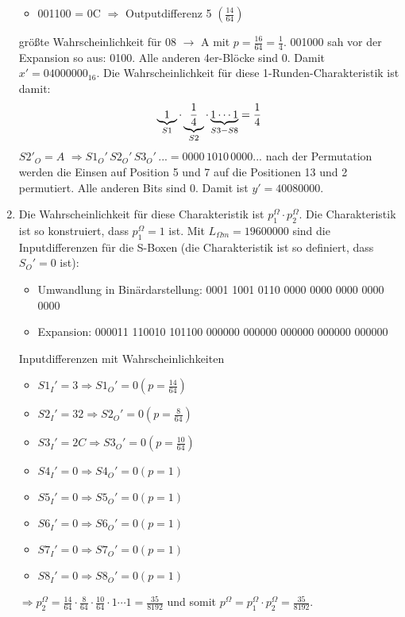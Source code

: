 \documentclass{article}
\begin{document}
\begin{enumerate}[label=(\alph*)]
\begin{itemize}
			\item 001100 = 0C $\Rightarrow$ Outputdifferenz 5 $\left(\frac{14}{64}\right)$
		\end{itemize}
		größte Wahrscheinlichkeit für 08 $\to$ A mit $p=\frac{16}{64} = \frac{1}{4}$. 001000 sah vor der Expansion so aus: 0100. Alle anderen 4er-Blöcke sind 0. Damit $x' = 04000000_{16}$. Die Wahrscheinlichkeit für diese 1-Runden-Charakteristik ist damit:
		\begin{align}
			\underbrace{1}_{S1}\cdot \underbrace{\frac{1}{4}}_{S2} \cdot \underbrace{1 \cdots 1}_{S3-S8} = \frac{1}{4} \notag
		\end{align}
		$S2'_O = A$ $\Rightarrow S1_O' \, S2_O' \, S3_O' \, ... = 0000 \, 1010 \, 0000 ...$ nach der Permutation werden die Einsen auf Position 5 und 7 auf die Positionen 13 und 2 permutiert. Alle anderen Bits sind 0. Damit ist $y'=40080000$.
		\item Die Wahrscheinlichkeit für diese Charakteristik ist $p_1^\Omega \cdot p_2^\Omega$. Die Charakteristik ist so konstruiert, dass $p_1^\Omega = 1$ ist. Mit $L_{\Omega m} = 19600000$ sind die Inputdifferenzen für die S-Boxen (die Charakteristik ist so definiert, dass $S_O' = 0$ ist):
		\begin{itemize}
			\item Umwandlung in Binärdarstellung: 0001 1001 0110 0000 0000 0000 0000 0000
			\item Expansion: 000011 110010 101100 000000 000000 000000 000000 000000
		\end{itemize}
		Inputdifferenzen mit Wahrscheinlichkeiten
		\begin{itemize}
			\item $S1_I' = 3 \Rightarrow S1_O' = 0 \left(p = \frac{14}{64}\right)$
			\item $S2_I' = 32 \Rightarrow S2_O' = 0 \left(p = \frac{8}{64}\right)$
			\item $S3_I' = 2C \Rightarrow S3_O' = 0 \left(p = \frac{10}{64}\right)$
			\item $S4_I' = 0 \Rightarrow S4_O' = 0 \left(p = 1\right)$
			\item $S5_I' = 0 \Rightarrow S5_O' = 0 \left(p = 1\right)$
			\item $S6_I' = 0 \Rightarrow S6_O' = 0 \left(p = 1\right)$
			\item $S7_I' = 0 \Rightarrow S7_O' = 0 \left(p = 1\right)$
			\item $S8_I' = 0 \Rightarrow S8_O' = 0 \left(p = 1\right)$
		\end{itemize}
		$\Rightarrow p_2^\Omega =  \frac{14}{64}\cdot \frac{8}{64}\cdot \frac{10}{64} \cdot 1\cdots 1 = \frac{35}{8192}$ und somit $p^\Omega = p_1^\Omega \cdot p_2^\Omega = \frac{35}{8192}$.
	\end{enumerate}
\end{document}
